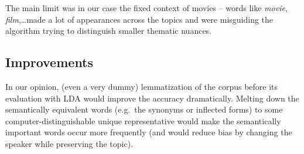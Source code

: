 \documentclass[12pt]{article}
\begin{document}
    The main limit was in our case the fixed context of movies -- words like \textit{movie}, \textit{film},\ldots made a lot of appearances across the topics
    and were misguiding the algorithm trying to distinguish smaller thematic nuances.

    \subsection{Improvements}
    In our opinion, (even a very dummy) lemmatization of the corpus before its evaluation with LDA would improve the accuracy dramatically.
    Melting down the semantically equivalent words (e.g.\ the synonyms or inflected forms) to some computer-distinguishable
    unique representative would make the semantically important words occur more frequently (and would reduce bias by changing the speaker while preserving the topic).
    
    
\end{document}
